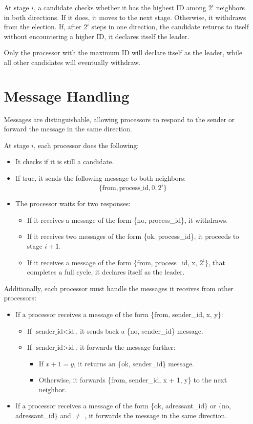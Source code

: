 \documentclass{article}
\begin{document}
At stage $i$, a candidate checks whether it has the highest ID among $2^i$ neighbors in both directions. If it does, it moves to the next stage. Otherwise, it withdraws from the election. If, after $2^i$ steps in one direction, the candidate returns to itself without encountering a higher ID, it declares itself the leader.

Only the processor with the maximum ID will declare itself as the leader, while all other candidates will eventually withdraw.

\section{Message Handling}
Messages are distinguishable, allowing processors to respond to the sender or forward the message in the same direction.

At stage $i$, each processor does the following:
\begin{itemize}
  \item It checks if it is still a candidate.
  \item If true, it sends the following message to both neighbors:
  \[
    \{\text{from}, \text{process\_id}, 0, 2^i\}
  \]
  \item The processor waits for two responses:
  \begin{itemize}
    \item If it receives a message of the form \{no, process\_id\}, it withdraws.
    \item If it receives two messages of the form \{ok, process\_id\}, it proceeds to stage $i+1$.
    \item If it receives a message of the form \{from, process\_id, x, $2^i$\}, that completes a full cycle, it declares itself as the leader.
  \end{itemize}
\end{itemize}

Additionally, each processor must handle the messages it receives from other processors:
\begin{itemize}
  \item If a processor receives a message of the form \{from, sender\_id, x, y\}:
  \begin{itemize}
    \item If $\text{sender\_id} < \text{id}$, it sends back a \{no, sender\_id\} message.
    \item If $\text{sender\_id} > \text{id}$, it forwards the message further: \begin{itemize}
      \item If $x + 1 = y$, it returns an \{ok, sender\_id\} message.
      \item Otherwise, it forwards \{from, sender\_id, x + 1, y\} to the next neighbor.
    \end{itemize}
  \end{itemize}
  \item If a processor receives a message of the form \{ok, adressant\_id\} or \{no, adressant\_id\} and  $\neq$ , it forwards the message in the same direction.
\end{itemize}
\end{document}

